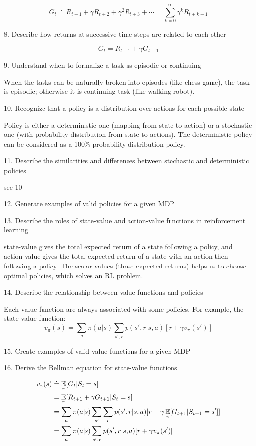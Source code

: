 \documentclass[sutton_barto_notes.tex]{subfiles}
\begin{document}
$$ G_t \doteq R_{t+1} + \gamma R_{t+2} + \gamma^2 R_{t+3} + \cdots = \sum_{k=0}^{\infty} \gamma^k R_{t+k+1} $$

8. Describe how returns at successive time steps are related to each other

$$ G_t = R_{t+1} + \gamma G_{t+1} $$

9. Understand when to formalize a task as episodic or continuing

When the tasks can be naturally broken into episodes (like chess game), the task is episodic; otherwise it is continuing task (like walking robot).

10. Recognize that a policy is a distribution over actions for each possible state

Policy is either a deterministic one (mapping from state to action) or a stochastic one (with probability distribution from state to actions).
The deterministic policy can be considered as a 100\% probability distribution policy.

11. Describe the similarities and differences between stochastic and deterministic policies

see 10

12. Generate examples of valid policies for a given MDP

13. Describe the roles of state-value and action-value functions in reinforcement learning

state-value gives the total expected return of a state following a policy, and action-value gives the total expected return of a state with an action then following a policy.
The scalar values (those expected returns) helps us to choose optimal policies, which solves an RL problem.

14. Describe the relationship between value functions and policies

Each value function are always associated with some policies. For example, the state value function:
$$v_\pi (s) = \sum_a \pi (a|s) \sum_{s',r} p(s',r|s,a)[r+\gamma v_\pi(s')] $$

15. Create examples of valid value functions for a given MDP

16. Derive the Bellman equation for state-value functions

\begin{align*}
v_\pi(s) & \doteq \operatorname*{\mathbb{E}}_\pi[G_t | S_t = s]\\
& = \operatorname*{\mathbb{E}}_\pi[R_{t+1} + \gamma G_{t+1} | S_t = s]\\
& = \sum_a \pi(a|s) \sum_{s'}\sum_r p(s',r|s,a) [r+ \gamma \operatorname*{\mathbb{E}}_\pi[G_{t+1} | S_{t+1}=s']]\\
& = \sum_a \pi(a|s) \sum_{s',r} p(s',r|s,a) [r+ \gamma v_\pi(s')]
\end{align*}
\end{document}
